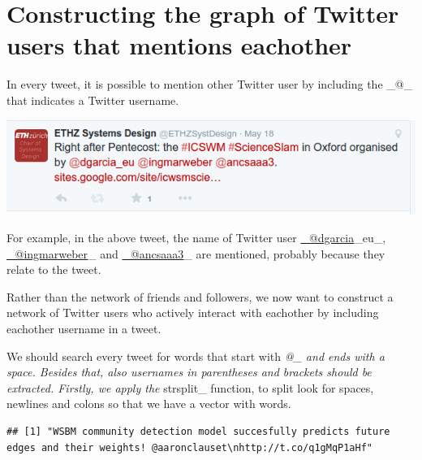 \documentclass[]{article}
\newenvironment{Shaded}{\begin{snugshade}}{\end{snugshade}}
\newcommand{\KeywordTok}[1]{\textcolor[rgb]{0.13,0.29,0.53}{\textbf{{#1}}}}
\newcommand{\DecValTok}[1]{\textcolor[rgb]{0.00,0.00,0.81}{{#1}}}
\newcommand{\CharTok}[1]{\textcolor[rgb]{0.31,0.60,0.02}{{#1}}}
\newcommand{\StringTok}[1]{\textcolor[rgb]{0.31,0.60,0.02}{{#1}}}
\newcommand{\NormalTok}[1]{{#1}}
\begin{document}
\section{Constructing the graph of Twitter users that mentions
eachother}\label{constructing-the-graph-of-twitter-users-that-mentions-eachother}

In every tweet, it is possible to mention other Twitter user by
including the \_@\_ that indicates a Twitter username.

\includegraphics{figures/tweet.png}

For example, in the above tweet, the name of Twitter user
\href{mailto:_@dgarcia}{\_@dgarcia}\_eu\_,
\href{mailto:_@ingmarweber}{\_@ingmarweber}\_ and
\href{mailto:_@ancsaaa3}{\_@ancsaaa3}\_ are mentioned, probably because
they relate to the tweet.

Rather than the network of friends and followers, we now want to
construct a network of Twitter users who actively interact with
eachother by including eachother username in a tweet.

We should search every tweet for words that start with \emph{@\_ and
ends with a space. Besides that, also usernames in parentheses and
brackets should be extracted. Firstly, we apply the }strsplit\_
function, to split look for spaces, newlines and colons so that we have
a vector with words.

\begin{Shaded}
\end{Shaded}

\begin{verbatim}
## [1] "WSBM community detection model succesfully predicts future edges and their weights! @aaronclauset\nhttp://t.co/q1gMqP1aHf"
\end{verbatim}

\begin{Shaded}
\end{Shaded}
\end{document}
